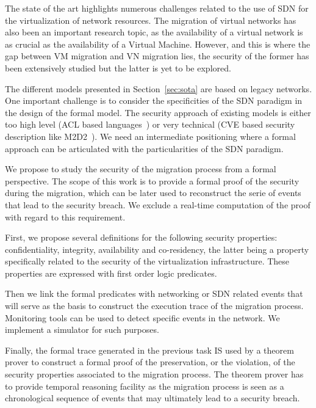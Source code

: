 The state of the art highlights numerous challenges related to the use of SDN for the virtualization of network resources.
The migration of virtual networks has also been an important research topic, as the availability of a virtual network is as crucial as the availability of a Virtual Machine.
However, and this is where the gap between VM migration and VN migration lies, the security of the former has been extensively studied but the latter is yet to be explored.

The different models presented in Section~\ref{sec:sota} are based on legacy networks.
One important challenge is to consider the specificities of the SDN paradigm in the design of the formal model.
The security approach of existing models is either too high level (ACL based languages~\cite{orbac,mulval-Ou2013}) or very technical (CVE based security description like M2D2~\cite{M2D2-Morin2002}).
We need an intermediate positioning where a formal approach can be articulated with the particularities of the SDN paradigm.

We propose to study the security of the migration process from a formal perspective.
The scope of this work is to provide a formal proof of the security during the migration, which can be later used to reconstruct the serie of events that lead to the security breach. We exclude a real-time computation of the proof with regard to this requirement.

First, we propose several definitions for the following security properties: confidentiality, integrity, availability 
and co-residency, the latter being a property specifically related to the security of the virtualization infrastructure.
These properties are expressed with first order logic predicates.

Then we link the formal predicates with networking or SDN related events that will serve as the basis to construct the execution trace of the migration process.
Monitoring tools can be used to detect specific events in the network. 
We implement a simulator for such purposes.

Finally, the formal trace generated in the previous task IS used by a theorem prover to construct a formal proof of the preservation, or the violation, of the security properties associated to the migration process. The theorem prover has to provide temporal reasoning facility as the migration process is seen as a chronological sequence of events that may ultimately lead to a security breach.
